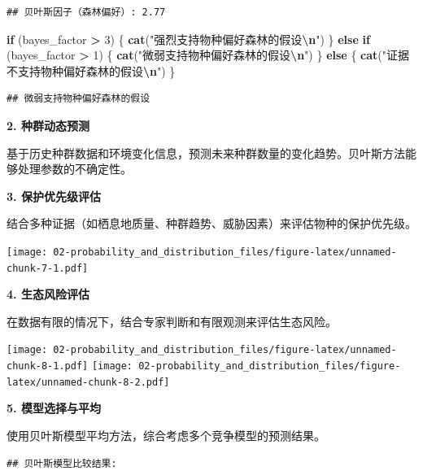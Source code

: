 \documentclass[
  twoside]{book}
\newenvironment{Shaded}{\begin{snugshade}}{\end{snugshade}}
\newcommand{\ControlFlowTok}[1]{\textcolor[rgb]{0.13,0.29,0.53}{\textbf{#1}}}
\newcommand{\DecValTok}[1]{\textcolor[rgb]{0.00,0.00,0.81}{#1}}
\newcommand{\FunctionTok}[1]{\textcolor[rgb]{0.13,0.29,0.53}{\textbf{#1}}}
\newcommand{\NormalTok}[1]{#1}
\newcommand{\SpecialCharTok}[1]{\textcolor[rgb]{0.81,0.36,0.00}{\textbf{#1}}}
\newcommand{\StringTok}[1]{\textcolor[rgb]{0.31,0.60,0.02}{#1}}
\begin{document}
\begin{verbatim}
## 贝叶斯因子（森林偏好）: 2.77
\end{verbatim}

\begin{Shaded}
\begin{Highlighting}[]
\ControlFlowTok{if}\NormalTok{ (bayes\_factor }\SpecialCharTok{\textgreater{}} \DecValTok{3}\NormalTok{) \{}
  \FunctionTok{cat}\NormalTok{(}\StringTok{"强烈支持物种偏好森林的假设}\SpecialCharTok{\textbackslash{}n}\StringTok{"}\NormalTok{)}
\NormalTok{\} }\ControlFlowTok{else} \ControlFlowTok{if}\NormalTok{ (bayes\_factor }\SpecialCharTok{\textgreater{}} \DecValTok{1}\NormalTok{) \{}
  \FunctionTok{cat}\NormalTok{(}\StringTok{"微弱支持物种偏好森林的假设}\SpecialCharTok{\textbackslash{}n}\StringTok{"}\NormalTok{)}
\NormalTok{\} }\ControlFlowTok{else}\NormalTok{ \{}
  \FunctionTok{cat}\NormalTok{(}\StringTok{"证据不支持物种偏好森林的假设}\SpecialCharTok{\textbackslash{}n}\StringTok{"}\NormalTok{)}
\NormalTok{\}}
\end{Highlighting}
\end{Shaded}

\begin{verbatim}
## 微弱支持物种偏好森林的假设
\end{verbatim}

\textbf{2. 种群动态预测}

基于历史种群数据和环境变化信息，预测未来种群数量的变化趋势。贝叶斯方法能够处理参数的不确定性。

\textbf{3. 保护优先级评估}

结合多种证据（如栖息地质量、种群趋势、威胁因素）来评估物种的保护优先级。

\texttt{[image: 02-probability\_and\_distribution\_files/figure-latex/unnamed-chunk-7-1.pdf]}

\textbf{4. 生态风险评估}

在数据有限的情况下，结合专家判断和有限观测来评估生态风险。

\texttt{[image: 02-probability\_and\_distribution\_files/figure-latex/unnamed-chunk-8-1.pdf]} \texttt{[image: 02-probability\_and\_distribution\_files/figure-latex/unnamed-chunk-8-2.pdf]}

\textbf{5. 模型选择与平均}

使用贝叶斯模型平均方法，综合考虑多个竞争模型的预测结果。

\begin{verbatim}
## 贝叶斯模型比较结果:
\end{verbatim}
\end{document}
